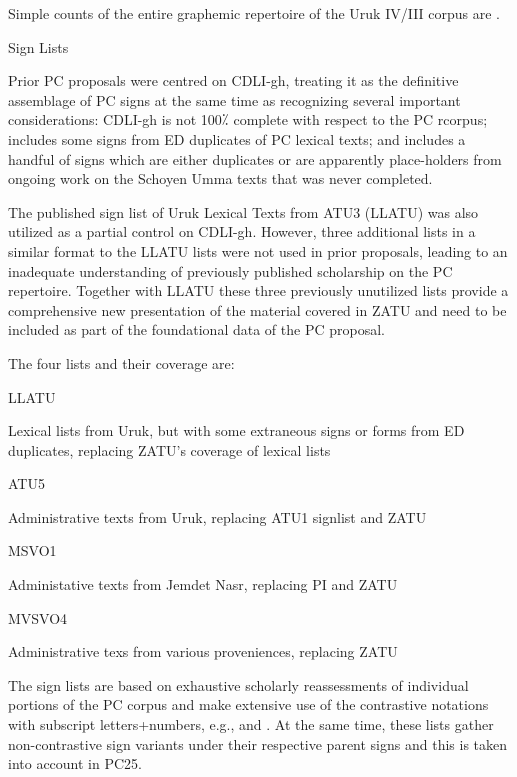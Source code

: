 \par Simple counts of the entire graphemic repertoire of the Uruk
      IV/III corpus are .

\Hh{}Sign Lists


\par Prior PC proposals were centred on CDLI-gh, treating it as
      the definitive assemblage of PC signs at the same time as
      recognizing several important considerations: CDLI-gh is not
      100⁒ complete with respect to the PC rcorpus; includes some
      signs from ED duplicates of PC lexical texts; and includes a
      handful of signs which are either duplicates or are apparently
      place-holders from ongoing work on the Schoyen Umma texts that
      was never completed.


\par The published sign list of Uruk Lexical Texts from ATU3
      (LLATU) was also utilized as a partial control on
      CDLI-gh. However, three additional lists in a similar format to
      the LLATU lists were not used in prior proposals, leading to an
      inadequate understanding of previously published scholarship on
      the PC repertoire.  Together with LLATU these three previously
      unutilized lists provide a comprehensive new presentation of the
      material covered in ZATU and need to be included as part of the
      foundational data of the PC proposal.


\par The four lists and their coverage are:

\Hdl\Hdt{}LLATU

{}Lexical lists from Uruk, but with some extraneous signs or
	forms from ED duplicates, replacing ZATU's coverage of lexical
	lists

\Hdt{}ATU5

{}Administrative texts from Uruk, replacing ATU1 signlist and ZATU

\Hdt{}MSVO1

{}Administative texts from Jemdet Nasr, replacing PI and ZATU

\Hdt{}MVSVO4

{}Administrative texs from various proveniences, replacing ZATU

\Henddl

\par The sign lists are based on exhaustive scholarly
      reassessments of individual portions of the PC corpus and make
      extensive use of the contrastive notations with subscript
      letters+numbers, e.g.,  and
      .  At the same time, these lists
      gather non-contrastive sign variants under their respective
      parent signs and this is taken into account in PC25.


